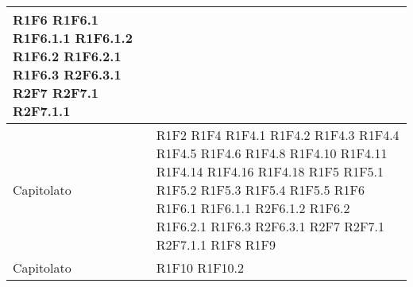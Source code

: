 \begin{center}
\begin{longtable}{|p{44mm}|p{22mm}|}
	R1F6 \newline
	R1F6.1 \newline
	R1F6.1.1 \newline
	R1F6.1.2 \newline
	R1F6.2 \newline
	R1F6.2.1 \newline
	R1F6.3 \newline
	R2F6.3.1 \newline
	R2F7 \newline
	R2F7.1 \newline
	R2F7.1.1
\\
\hline
Capitolato & 
	R1F2 \newline
	R1F4  \newline
	R1F4.1\newline
	R1F4.2\newline
	R1F4.3\newline
	R1F4.4\newline
	R1F4.5\newline
	R1F4.6\newline
	R1F4.8\newline
	R1F4.10\newline
	R1F4.11\newline
	R1F4.14\newline
	R1F4.16\newline
	R1F4.18\newline
	R1F5\newline
	R1F5.1\newline
	R1F5.2\newline
	R1F5.3\newline
	R1F5.4\newline
	R1F5.5\newline
	R1F6\newline
	R1F6.1\newline
	R1F6.1.1\newline
	R2F6.1.2\newline
	R1F6.2\newline
	R1F6.2.1\newline
	R1F6.3\newline
	R2F6.3.1\newline
	R2F7\newline
	R2F7.1\newline
	R2F7.1.1\newline
	R1F8  \newline
	R1F9
	\\
	\hline
	Capitolato &
	R1F10  \newline
	R1F10.2\newline

\end{longtable}
\end{center}
